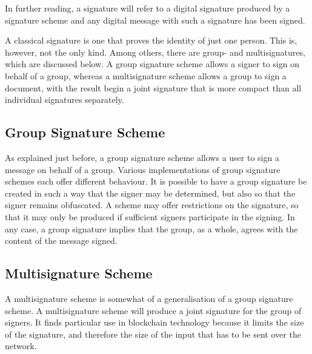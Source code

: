 In further reading, a signature will refer to a digital signature produced by a signature scheme and any digital message with such a signature has been signed.

A classical signature is one that proves the identity of just one person. This is, however, not the only kind. Among others, there are group- and multisignatures, which are discussed below. A group signature scheme allows a signer to sign on behalf of a group, whereas a multisignature scheme allows a group to sign a document, with the result begin a joint signature that is more compact than all individual signatures separately.

\subsection{Group Signature Scheme}
As explained just before, a group signature scheme allows a user to sign a message on behalf of a group. Various implementations of group signature schemes each offer different behaviour. It is possible to have a group signature be created in such a way that the signer may be determined, but also so that the signer remains obfuscated. A scheme may offer restrictions on the signature, so that it may only be produced if sufficient signers participate in the signing. In any case, a group signature implies that the group, as a whole, agrees with the content of the message signed.

\subsection{Multisignature Scheme}
A multisignature scheme is somewhat of a generalisation of a group signature scheme. A multisignature scheme will produce a joint signature for the group of signers. It finds particular use in blockchain technology because it limits the size of the signature, and therefore the size of the input that has to be sent over the network.

